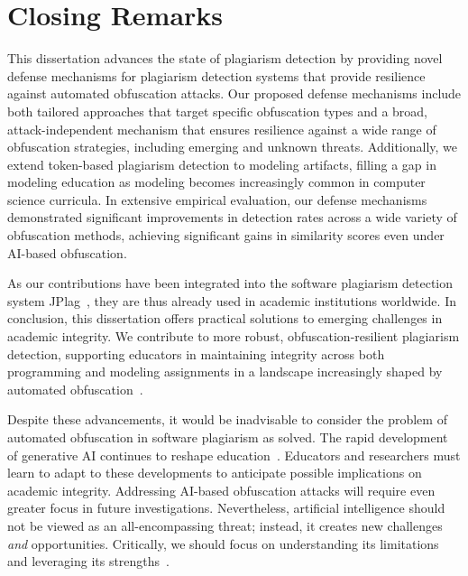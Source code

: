 \section{Closing Remarks}

This dissertation advances the state of plagiarism detection by providing novel defense mechanisms for plagiarism detection systems that provide resilience against automated obfuscation attacks.
Our proposed defense mechanisms include both tailored approaches that target specific obfuscation types and a broad, attack-independent mechanism that ensures resilience against a wide range of obfuscation strategies, including emerging and unknown threats.
Additionally, we extend token-based plagiarism detection to modeling artifacts, filling a gap in modeling education as modeling becomes increasingly common in computer science curricula.
In extensive empirical evaluation, our defense mechanisms demonstrated significant improvements in detection rates across a wide variety of obfuscation methods, achieving significant gains in similarity scores even under AI-based obfuscation.

As our contributions have been integrated into the software plagiarism detection system JPlag~\cite{prechelt2002}, they are thus already used in academic institutions worldwide.
%
In conclusion, this dissertation offers practical solutions to emerging challenges in academic integrity. We contribute to more robust, obfuscation-resilient plagiarism detection, supporting educators in maintaining integrity across both programming and modeling assignments in a landscape increasingly shaped by automated obfuscation~\cite{Foltynek2020, Biderman2022}.

Despite these advancements, it would be inadvisable to consider the problem of automated obfuscation in software plagiarism as solved.
The rapid development of generative AI continues to reshape education~\cite{ChatGPTGuide}. 
Educators and researchers must learn to adapt to these developments to anticipate possible implications on academic integrity.
Addressing AI-based obfuscation attacks will require even greater focus in future investigations.
Nevertheless, artificial intelligence should not be viewed as an all-encompassing threat; instead, it creates new challenges \textit{and} opportunities. Critically, we should focus on understanding its limitations and leveraging its strengths~\cite{Saglam2024Keynote}.


